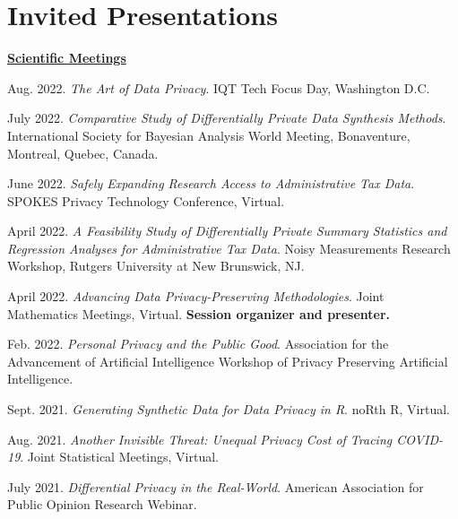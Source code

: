 \documentclass[11pt, letterpaper, roman]{moderncv} %
\begin{document}

\section{Invited Presentations}

\underline{\textbf{\large Scientific Meetings}}\normalsize
\vspace{6pt}
\begin{etaremune}[topsep=0pt, itemsep=2pt, partopsep=0pt, parsep=0pt]
    
    \item Aug. 2022. \textit{The Art of Data Privacy}. IQT Tech Focus Day, Washington D.C.
    
    \item July 2022. \textit{Comparative Study of Differentially Private Data Synthesis Methods}. International Society for Bayesian Analysis World Meeting, Bonaventure, Montreal, Quebec, Canada.
    
    \item June 2022. \textit{Safely Expanding Research Access to Administrative Tax Data}. SPOKES Privacy Technology Conference, Virtual.
    
    \item April 2022. \textit{A Feasibility Study of Differentially Private Summary Statistics and Regression Analyses for Administrative Tax Data}. Noisy Measurements Research Workshop, Rutgers University at New Brunswick, NJ.
    
    \item April 2022. \textit{Advancing Data Privacy-Preserving Methodologies}. Joint Mathematics Meetings, Virtual. \textbf{Session organizer and presenter.}

    \item Feb. 2022. \textit{Personal Privacy and the Public Good}. Association for the Advancement of Artificial Intelligence Workshop of Privacy Preserving Artificial Intelligence.
    
    \item Sept. 2021. \textit{Generating Synthetic Data for Data Privacy in R}. noRth R, Virtual.

    \item Aug. 2021. \textit{Another Invisible Threat: Unequal Privacy Cost of Tracing COVID-19}. Joint Statistical Meetings, Virtual.
    
    \item July 2021. \textit{Differential Privacy in the Real-World}. American Association for Public Opinion Research Webinar.


\end{etaremune}
\end{document}
